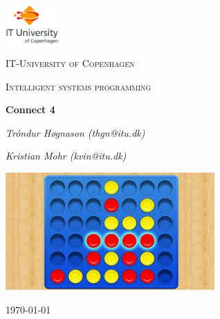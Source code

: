 
\begin{titlepage}
	\centering
	\includegraphics[width=0.15\textwidth]{logo}\par\vspace{1cm}
	{\scshape\LARGE IT-University of Copenhagen \par}
	\vspace{1cm}
	{\scshape\Large Intelligent systems programming\par}
	\vspace{1.5cm}
	{\huge\bfseries Connect 4\par}
	\vspace{2cm}
	{\Large\itshape Tróndur Høgnason (thgn@itu.dk)\par}
	{\Large\itshape Kristian Mohr (kvin@itu.dk)\par}
	\vspace{2 cm}
	\includegraphics[width=0.6\textwidth]{connect}\par\vspace{1cm}
\vspace{\fill}
	{\large \today\par}
\end{titlepage}